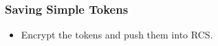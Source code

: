 \begin{frame}
	\frametitle{Saving Simple Tokens}
	\begin{itemize}
		\item Encrypt the tokens and push them into RCS.
	\end{itemize}
\end{frame}
